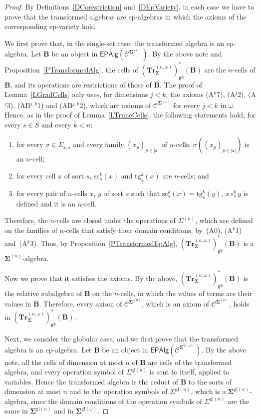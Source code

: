 \documentclass[a4paper, reqno
]{amsart}
\newcommand{\bb}[1]{\ensuremath{\lvert #1 \rvert}}
\newcommand{\sig}[1]{\mathbf{#1}}             %
\newcommand{\spec}[1]{\boldsymbol{\mathcal{#1}}} %
\newcommand{\gd}{\mathfrak{gd}}              %
\newcommand{\gl}{\mathrm{gl}}                %
\newcommand{\src}{\mathrm{sc}}
\newcommand{\tgt}{\mathrm{tg}}
\newcommand{\bTr}{\mathbf{Tr}}
\theoremstyle{plain}
\theoremstyle{definition}
\begin{document}
\begin{proof}
By Definitions~\ref{DCorestriction} and~\ref{DEpVariety}, in each case we have to prove that the transformed algebras are ep-algebras in which the axioms of the corresponding ep-variety hold.

We first prove that, in the single-set case, the transformed algebra is an ep-algebra.
Let $\mathbf{B}$ be an object in $\mathsf{EPAlg}(\spec{C}^{\sig{\Sigma}^{(\omega)}})$.
By the above note and Proposition~\ref{PTransformedAlg}, the cells of $(\bTr^{(n,\omega)}_{\sig{\Sigma}})^{\ast}_{\gd}(\mathbf{B})$ are the $n$-cells of $\mathbf{B}$, and its operations are restrictions of those of $\mathbf{B}$.
The proof of Lemma~\ref{LGradCells} only uses, for dimensions $j<k$, the axioms (A$^{k}$7), (A$^{j}$2), (A$^{j}$3), (AB$^{j,k}$1) and (AB$^{j,k}$2), which are axioms of $\spec{C}^{\sig{\Sigma}^{(\omega)}}$ for every $j<k$ in $\omega$.
Hence, as in the proof of Lemma~\ref{LTruncCells}, the following statements hold, for every $s\in S$ and every $k<n$:
\begin{enumerate}
\item for every $\sigma\in\Sigma_{\mathbf{s},s}$ and every family $(x_{p})_{p\in\bb{\mathbf{s}}}$ of $n$-cells, $\sigma((x_{p})_{p\in\bb{\mathbf{s}}})$ is an $n$-cell;
\item for every cell $x$ of sort $s$, $\src^{k}_{s}(x)$ and $\tgt^{k}_{s}(x)$ are $n$-cells; and
\item for every pair of $n$-cells $x$, $y$ of sort $s$ such that $\src^{k}_{s}(x)=\tgt^{k}_{s}(y)$, $x\circ^{k}_{s}y$ is defined and it is an $n$-cell.
\end{enumerate}
Therefore, the $n$-cells are closed under the operations of $\Sigma^{(n)}$, which are defined on the families of $n$-cells that satisfy their domain conditions, by~(A0), (A$^{k}$1) and~(A$^{k}$3).
Thus, by Proposition~\ref{PTransformedEpAlg}, $(\bTr^{(n,\omega)}_{\sig{\Sigma}})^{\ast}_{\gd}(\mathbf{B})$ is a $\sig{\Sigma}^{(n)}$-algebra.

Now we prove that it satisfies the axioms.
By the above, $(\bTr^{(n,\omega)}_{\sig{\Sigma}})^{\ast}_{\gd}(\mathbf{B})$ is the relative subalgebra of $\mathbf{B}$ on the $n$-cells, in which the values of terms are their values in $\mathbf{B}$.
Therefore, every axiom of $\spec{C}^{\sig{\Sigma}^{(n)}}$, which is an axiom of $\spec{C}^{\sig{\Sigma}^{(\omega)}}$, holds in $(\bTr^{(n,\omega)}_{\sig{\Sigma}})^{\ast}_{\gd}(\mathbf{B})$.

Next, we consider the globular case, and we first prove that the transformed algebra is an ep-algebra.
Let $\mathbf{B}$ be an object in $\mathsf{EPAlg}(\spec{C}^{\sig{\Sigma}^{\gl(\omega)}})$.
By the above note, all the cells of dimension at most $n$ of $\mathbf{B}$ are cells of the transformed algebra, and every operation symbol of $\Sigma^{\gl(n)}$ is sent to itself, applied to variables.
Hence the transformed algebra is the reduct of $\mathbf{B}$ to the sorts of dimension at most $n$ and to the operation symbols of $\Sigma^{\gl(n)}$, which is a $\sig{\Sigma}^{\gl(n)}$-algebra, since the domain conditions of the operation symbols of $\Sigma^{\gl(n)}$ are the same in $\sig{\Sigma}^{\gl(n)}$ and in $\sig{\Sigma}^{\gl(\omega)}$.


\end{proof}
\end{document}
